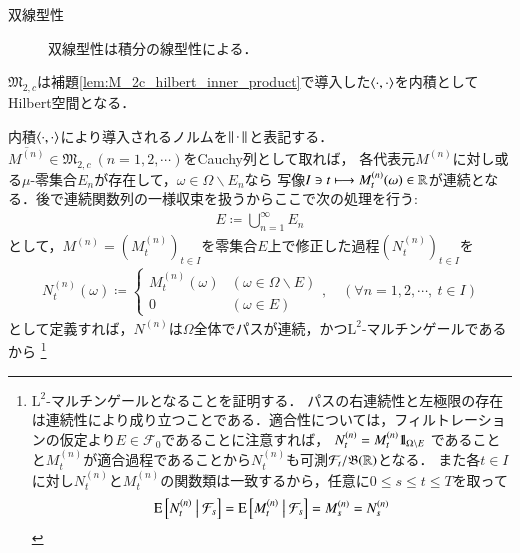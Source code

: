 \begin{prf}
\begin{description}
			\item[双線型性]
				双線型性は積分の線型性による．
			\end{description}
		\QED
	\end{prf}
		
	\begin{itembox}[l]{}
		\begin{prp}
			$\mathfrak{M}_{2,c}$は補題\ref{lem:M_2c_hilbert_inner_product}で導入した$\inprod<\cdot,\cdot>$を内積としてHilbert空間となる．
		\end{prp}
	\end{itembox}
			
	\begin{prf}
			内積$\inprod<\cdot,\cdot>$により導入されるノルムを$\left\|\, \cdot\, \right\|_{}$と表記する．
			$\overline{M^{(n)}} \in \mathfrak{M}_{2,c}\ (n=1,2,\cdots)$をCauchy列として取れば，
			各代表元$M^{(n)}$に対し或る$\mu$-零集合$E_n$が存在して，$\omega \in \Omega \backslash E_n$なら
			写像$I \ni t \longmapsto M^{(n)}_t(\omega) \in \mathbb{R}$が連続となる．後で連続関数列の一様収束を扱うからここで次の処理を行う:
			\begin{align}
				E \coloneqq \bigcup_{n=1}^{\infty} E_n
			\end{align}
			として，$M^{(n)} = (M^{(n)}_t)_{t \in I}$を零集合$E$上で修正した過程$(N^{(n)}_t)_{t \in I}$を
			\begin{align}
				N^{(n)}_t(\omega) \coloneqq
				\begin{cases}
					M^{(n)}_t(\omega) & (\omega \in \Omega \backslash E) \\
					0 & (\omega \in E)
				\end{cases}
				,\quad (\forall n = 1,2,\cdots,\ t \in I)
			\end{align}
		として定義すれば，$N^{(n)}$は$\Omega$全体でパスが連続，かつ$\mathrm{L}^2$-マルチンゲールであるから
		\footnote{
			$\mathrm{L}^2$-マルチンゲールとなることを証明する．
			パスの右連続性と左極限の存在は連続性により成り立つことである．適合性については，フィルトレーションの仮定より$E \in \mathcal{F}_0$であることに注意すれば，
			$N^{(n)}_t = M^{(n)}_t \mbox{1}\hspace{-0.25em}\mbox{l}_{\Omega \backslash E}$
			であることと$M^{(n)}_t$が適合過程であることから$N^{(n)}_t$も可測$\mathcal{F}_t/\mathfrak{B}(\mathbb{R})$となる．
			また各$t \in I$に対し$N^{(n)}_t$と$M^{(n)}_t$の関数類は一致するから，任意に$0 \leq s \leq t \leq T$を取って
			\begin{align}
				\operatorname{E} \left[ N^{(n)}_t \ \middle|\ \mathcal{F}_s \right] = \operatorname{E} \left[ M^{(n)}_t \ \middle|\ \mathcal{F}_s \right] = M^{(n)}_s = N^{(n)}_s
			\end{align}
}
\end{prf}
